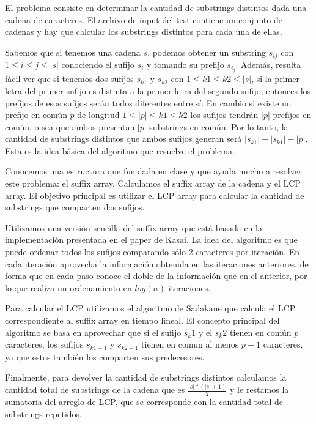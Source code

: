 El problema consiste en determinar la cantidad de substrings distintos dada
una cadena de caracteres. El archivo de input del test contiene un conjunto de
cadenas y hay que calcular los substrings distintos para cada una de ellas.

Sabemos que si tenemos una cadena $s$, podemos obtener un substring $s_{ij}$
con $1 \le i \le j \le |s|$ conociendo el sufijo $s_i$ y tomando su prefijo
$s_{i_j}$. Además, resulta fácil ver que si tenemos dos sufijos $s_{k1}$ y 
$s_{k2}$ con $1 \le k1 \le k2 \le |s|$, si la primer letra del primer sufijo
es distinta a la primer letra del segundo sufijo, entonces los prefijos de esos
sufijos serán todos diferentes entre sí. En cambio si existe un prefijo en común
$p$ de longitud $1 \le |p| \le k1 \le k2$ los sufijos tendrán $|p|$ prefijos
en común, o sea que ambos presentan $|p|$ substrings en común. Por lo tanto, la
cantidad de substrings distintos que ambos sufijos generan será $|s_{k1}| + |s_{k1}| - |p|$.
Esta es la idea básica del algoritmo que resuelve el problema.

Conocemos una estructura que fue dada en clase y que ayuda mucho a resolver este
problema: el suffix array. Calculamos el suffix array de la cadena y el LCP array.
El objetivo principal es utilizar el LCP array para calcular la cantidad de substrings
que comparten dos sufijos.

Utilizamos una versión sencilla del suffix array que está basada en la
implementación presentada en el paper de Kasai. La idea del algoritmo es que
puede ordenar todos los sufijos comparando sólo 2 caracteres por iteración. En
cada iteración aprovecha la información obtenida en las iteraciones anteriores,
de forma que en cada paso conoce el doble de la información que en el anterior,
por lo que realiza un ordenamiento en $log(n)$ iteraciones.

Para calcular el LCP utilizamos el algoritmo de Sadakane que calcula el LCP
correspondiente al suffix array en tiempo lineal. El concepto principal del
algoritmo se basa en aprovechar que si el sufijo $s_k1$ y el $s_k2$ tienen en
común $p$ caracteres, los sufijos $s_{k1+1}$ y $s_{k2+1}$ tienen en comun al
menos $p-1$ caracteres, ya que estos también los comparten sus predecesores.

Finalmente, para devolver la cantidad de substrings distintos calculamos la cantidad
total de substrings de la cadena que es $\displaystyle\frac{|s|*(|s|+1)}{2}$ y le restamos la
sumatoria del arreglo de LCP, que se corresponde con la cantidad total de substrings
repetidos.

